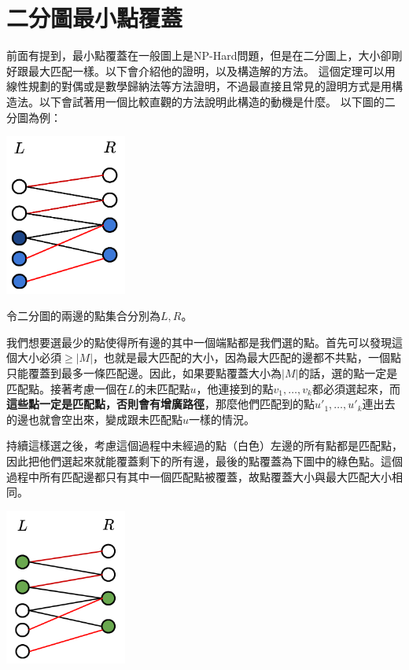 \section{二分圖最小點覆蓋}
前面有提到，最小點覆蓋在一般圖上是NP-Hard問題，但是在二分圖上，大小卻剛好跟最大匹配一樣。以下會介紹他的證明，以及構造解的方法。
這個定理可以用線性規劃的對偶或是數學歸納法等方法證明，不過最直接且常見的證明方式是用構造法。以下會試著用一個比較直觀的方法說明此構造的動機是什麼。
以下圖的二分圖為例：
\begin{center}
    \includegraphics[width=4cm]{images/Matching/VertexCover1.png}
\end{center}
令二分圖的兩邊的點集合分別為$L, R$。
\par 我們想要選最少的點使得所有邊的其中一個端點都是我們選的點。首先可以發現這個大小必須$\geq |M|$，也就是最大匹配的大小，因為最大匹配的邊都不共點，一個點只能覆蓋到最多一條匹配邊。因此，如果要點覆蓋大小為$|M|$的話，選的點一定是匹配點。接著考慮一個在$L$的未匹配點$u$，他連接到的點$v_1, \dots, v_k$都必須選起來，而\textbf{這些點一定是匹配點，否則會有增廣路徑}，那麼他們匹配到的點$u'_1, \dots, u'_k$連出去的邊也就會空出來，變成跟未匹配點$u$一樣的情況。
\par 持續這樣選之後，考慮這個過程中未經過的點（白色）左邊的所有點都是匹配點，因此把他們選起來就能覆蓋剩下的所有邊，最後的點覆蓋為下圖中的綠色點。這個過程中所有匹配邊都只有其中一個匹配點被覆蓋，故點覆蓋大小與最大匹配大小相同。
\begin{center}
    \includegraphics[width=4cm]{images/Matching/VertexCover2.png}
\end{center}
